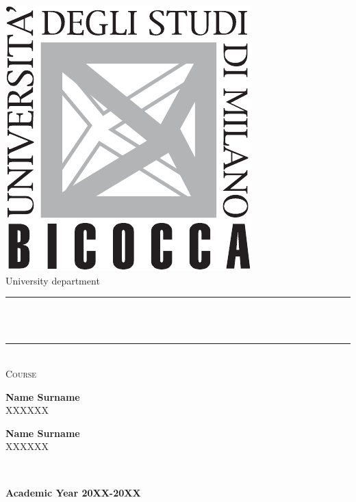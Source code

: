 \newpage
\pagestyle{empty} %
\noindent

\begin{titlepage}
	\centering
	\includegraphics[scale = 0.5]{logo.pdf}\\[1 cm]
	{\large University department}\\[1.2 
	cm]	
	\rule{\linewidth}{0.2 mm} \\[0.4 cm]
	{ \huge \bfseries \thetitle}\\
	\rule{\linewidth}{0.2 mm} \\[1.0 cm]
	
	\textsc{\Large Course}\\[2.2 cm]	
	
		\begin{minipage}{.4\linewidth}
			\begin{flushleft}                           
				\textbf{Name Surname} \\
				\quad \: {XXXXXX}
			\end{flushleft} 
		\end{minipage}
		\hspace{-90mm}
		\begin{minipage}{.4\linewidth}
			\begin{flushright}                                      
				\textbf{Name Surname} \\ 
				{XXXXXX}\quad \: { }
			\end{flushright} 
		\end{minipage}\\[1 cm]

	\begin{center} \textbf{Academic Year 20XX-20XX }\end{center}
	
\end{titlepage}
